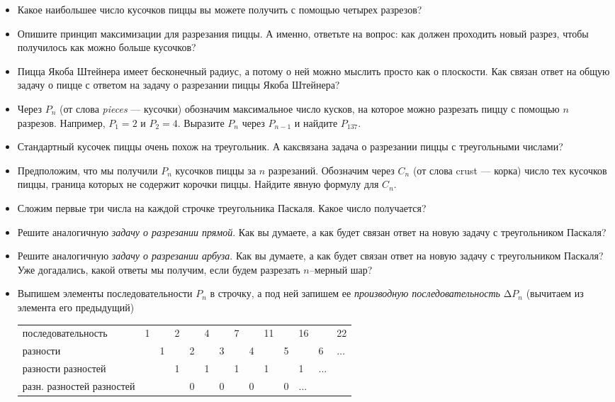 \begin{itemize}
\item Какое наибольшее число кусочков пиццы вы можете получить с помощью четырех разрезов?
\item Опишите принцип максимизации для разрезания пиццы. А именно, ответьте на вопрос: как должен проходить новый разрез, чтобы получилось как можно больше кусочков?
\item Пицца Якоба Штейнера имеет бесконечный радиус, а потому о ней можно мыслить просто как о плоскости. Как связан ответ на общую задачу о пицце с ответом на задачу о разрезании пиццы Якоба Штейнера?
\item Через $P_n$ (от слова {\itshape pieces} --- кусочки) обозначим максимальное число кусков, на которое можно разрезать пиццу с помощью $n$ разрезов. Например, $P_1 = 2$ и $P_2 = 4$. Выразите $P_n$ через $P_{n-1}$ и найдите $P_{137}$.
\item Стандартный кусочек пиццы очень похож на треугольник. А как\linebreak связана задача о разрезании пиццы с треугольными числами?
\item Предположим, что мы получили $P_n$ кусочков пиццы за $n$ разрезаний. Обозначим через $C_n$ (от слова crust --- корка) число тех кусочков пиццы, граница которых не содержит корочки пиццы. Найдите явную формулу для $C_n$.
\item Сложим первые три числа на каждой строчке треугольника Паскаля. Какое число получается?
\item Решите аналогичную {\itshape задачу о разрезании прямой}. Как вы думаете, а как будет связан ответ на новую задачу с треугольником Паскаля?
\item Решите аналогичную {\itshape задачу о разрезании арбуза}. Как вы думаете, а как будет связан ответ на новую задачу с треугольником Паскаля? Уже догадались, какой ответы мы получим, если будем разрезать $n$--мерный шар?

\item Выпишем элементы последовательности $P_n$ в строчку, а под ней запишем ее {\itshape производную последовательность} $\text{Δ} P_n$ (вычитаем из элемента его предыдущий)

\begin{center} \scriptsize \begin{tabular}{llllllllllllll}
	\hline
	{\tiny последовательность} & 1 & & 2 & & 4 & & 7 & & 11 & & 16 & & 22\\
	{\tiny разности} & & 1 & & 2 & & 3 & & 4 & & 5 & & 6 & $\ldots$ \\
	{\tiny разности разностей} & & & 1 & & 1 & & 1 & & 1 & & 1 & $\ldots$ \\
	{\tiny разн. разностей разностей} & & & & 0 & & 0 & & 0 & & 0 & $\ldots$ \\
	\hline
\end{tabular} \end{center} \medskip


\end{itemize}
